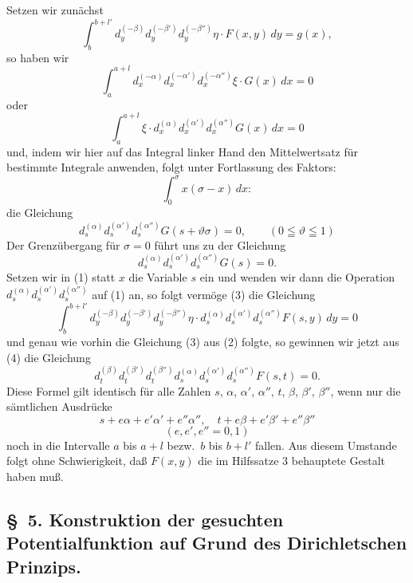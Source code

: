 \documentclass{article}
\begin{document}
Setzen wir zunächst
\[
\int_b^{b+l'} d_y^{(-\beta)} d_y^{(-\beta')} d_y^{(-\beta'')} \eta \cdot F(x, y)\,dy = g(x), \tag{1}
\]
so haben wir
\[
\int_a^{a+l} d_x^{(-\alpha)} d_x^{(-\alpha')} d_x^{(-\alpha'')} \xi \cdot G(x)\,dx = 0 \tag{2}
\]
oder
\[
\int_a^{a+l} \xi \cdot d_x^{(\alpha)} d_x^{(\alpha')} d_x^{(\alpha'')} G(x)\,dx = 0
\]
und, indem wir hier auf das Integral linker Hand den Mittelwertsatz für bestimmte Integrale anwenden, folgt unter Fortlassung des Faktors:
\[
\int_0^\sigma x(\sigma - x)\,dx:
\]
die Gleichung
\[
d_s^{(\alpha)} d_s^{(\alpha')} d_s^{(\alpha'')} G(s + \vartheta\sigma) = 0, \qquad (0 \leqq \vartheta \leqq 1)
\]
Der Grenzübergang für $\sigma = 0$ führt uns zu der Gleichung
\[
d_s^{(\alpha)} d_s^{(\alpha')} d_s^{(\alpha'')} G(s) = 0. \tag{3}
\]
Setzen wir in (1) statt $x$ die Variable $s$ ein und wenden wir dann die Operation $d_s^{(\alpha)} d_s^{(\alpha')} d_s^{(\alpha'')}$ auf (1) an, so folgt vermöge (3) die Gleichung
\[
\int_b^{b+l'} d_y^{(-\beta)} d_y^{(-\beta')} d_y^{(-\beta'')} \eta \cdot d_s^{(\alpha)} d_s^{(\alpha')} d_s^{(\alpha'')} F(s, y)\,dy = 0
\]
und genau wie vorhin die Gleichung (3) aus (2) folgte, so gewinnen wir jetzt aus (4) die Gleichung
\[
d_t^{(\beta)} d_t^{(\beta')} d_t^{(\beta'')} d_s^{(\alpha)} d_s^{(\alpha')} d_s^{(\alpha'')} F(s, t) = 0.
\]
Diese Formel gilt identisch für alle Zahlen $s$, $\alpha$, $\alpha'$, $\alpha''$, $t$, $\beta$, $\beta'$, $\beta''$, wenn nur die sämtlichen Ausdrücke
\[
s + e\alpha + e'\alpha' + e''\alpha'', \quad t + e\beta + e'\beta' + e''\beta''
\]
\[
(e, e', e'' = 0, 1)
\]
noch in die Intervalle $a$ bis $a+l$ bezw.\ $b$ bis $b+l'$ fallen. Aus diesem Umstande folgt ohne Schwierigkeit, daß $F(x, y)$ die im Hilfssatze 3 behauptete Gestalt haben muß.


\subsection*{§~5. Konstruktion der gesuchten Potentialfunktion auf Grund des Dirichletschen Prinzips.}
\end{document}
